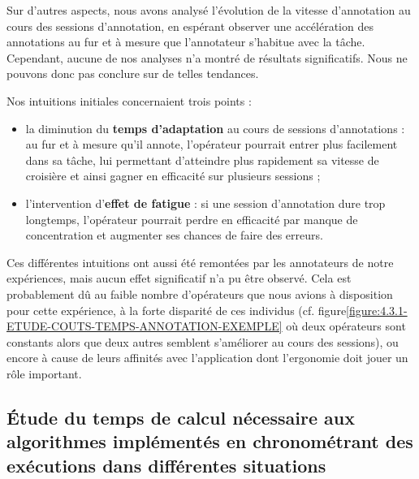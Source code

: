 			Sur d'autres aspects, nous avons analysé l'évolution de la vitesse d'annotation au cours des sessions d'annotation, en espérant observer une accélération des annotations au fur et à mesure que l'annotateur s'habitue avec la tâche. Cependant, aucune de nos analyses n'a montré de résultats significatifs.
			Nous ne pouvons donc pas conclure sur de telles tendances.
			\begin{leftBarAuthorOpinion}
				Nos intuitions initiales concernaient trois points :
				\begin{itemize}
					\item la diminution du \textbf{temps d'adaptation} au cours de sessions d'annotations : au fur et à mesure qu'il annote, l'opérateur pourrait entrer plus facilement dans sa tâche, lui permettant d'atteindre plus rapidement sa vitesse de croisière et ainsi gagner en efficacité sur plusieurs sessions ;
					\item l'intervention d'\textbf{effet de fatigue} : si une session d'annotation dure trop longtemps, l'opérateur pourrait perdre en efficacité par manque de concentration et augmenter ses chances de faire des erreurs.
				\end{itemize}
				Ces différentes intuitions ont aussi été remontées par les annotateurs de notre expériences, mais aucun effet significatif n'a pu être observé.
				Cela est probablement dû au faible nombre d'opérateurs que nous avions à disposition pour cette expérience, à la forte disparité de ces individus (cf. figure\ref{figure:4.3.1-ETUDE-COUTS-TEMPS-ANNOTATION-EXEMPLE} où deux opérateurs sont constants alors que deux autres semblent s'améliorer au cours des sessions), ou encore à cause de leurs affinités avec l'application dont l'ergonomie doit jouer un rôle important.
			\end{leftBarAuthorOpinion}
	

	\subsection{Étude du temps de calcul nécessaire aux algorithmes implémentés en chronométrant des exécutions dans différentes situations}
	\label{section:4.3.2-ETUDE-COUTS-TEMPS-CALCUL}
	
